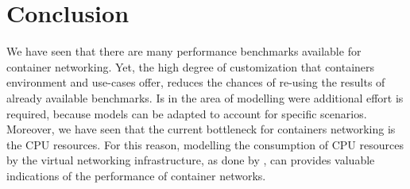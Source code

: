 \documentclass[conference]{IEEEtran}
\begin{document}
\section{Conclusion}
We have seen that there are many performance benchmarks available for container networking. Yet, the high degree of customization that containers environment and use-cases offer, reduces the chances of re-using the results of already available benchmarks. Is in the area of modelling were additional effort is required, because models can be adapted to account for specific scenarios. Moreover, we have seen that the  current bottleneck for containers networking is the CPU resources. For this reason, modelling the consumption of CPU resources by the virtual networking infrastructure, as done by \cite{ANCS:Gallenmüller}, can provides valuable indications of the performance of container networks.


\end{document}

